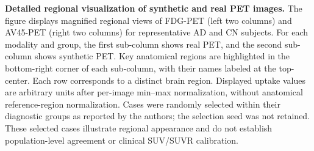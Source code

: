 \caption{
\textbf{Detailed regional visualization of synthetic and real PET images.}
The figure displays magnified regional views of FDG-PET (left two columns) and AV45-PET (right two columns) for representative AD and CN subjects. 
For each modality and group, the first sub-column shows real PET, and the second sub-column shows synthetic PET. 
Key anatomical regions are highlighted in the bottom-right corner of each sub-column, with their names labeled at the top-center. 
Each row corresponds to a distinct brain region. Displayed uptake values are arbitrary units after per-image min--max normalization, without anatomical reference-region normalization. Cases were randomly selected within their diagnostic groups as reported by the authors; the selection seed was not retained. These selected cases illustrate regional appearance and do not establish population-level agreement or clinical SUV/SUVR calibration.
}
    \label{fig:3}
